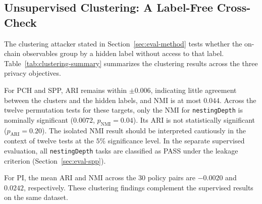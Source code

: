 \subsection{Unsupervised Clustering: A Label-Free Cross-Check}
\label{sec:eval-clustering}
The clustering attacker stated in Section~\ref{sec:eval-method} tests whether the on-chain observables group by a hidden label without access to that label.
Table~\ref{tab:clustering-summary} summarizes the clustering results across the three privacy objectives.

For PCH and SPP, ARI remains within $\pm 0.006$, indicating little agreement between the clusters and the hidden labels, and NMI is at most $0.044$.
Across the twelve permutation tests for these targets, only the NMI for \texttt{nestingDepth} is nominally significant ($0.0072$, $p_{\mathrm{NMI}}=0.04$).
Its ARI is not statistically significant ($p_{\mathrm{ARI}}=0.20$).
The isolated NMI result should be interpreted cautiously in the context of twelve tests at the $5\%$ significance level.
In the separate supervised evaluation, all \texttt{nestingDepth} tasks are classified as PASS under the leakage criterion (Section~\ref{sec:eval-spp}).

For PI, the mean ARI and NMI across the $30$ policy pairs are $-0.0020$ and $0.0242$, respectively.
These clustering findings complement the supervised results on the same dataset.


